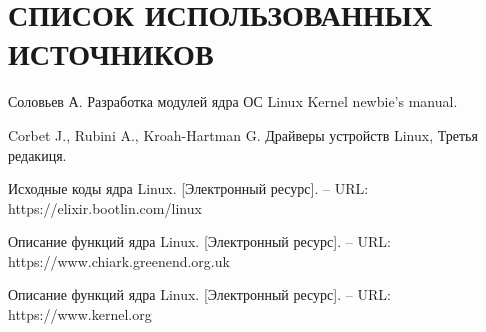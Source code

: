 \section*{СПИСОК ИСПОЛЬЗОВАННЫХ ИСТОЧНИКОВ}

\begingroup
\renewcommand{\section}[2]{}
\begin{thebibliography}{}
	Соловьев А. Разработка модулей ядра ОС Linux Kernel newbie's manual.

	Corbet J., Rubini A., Kroah-Hartman G. Драйверы устройств Linux, Третья редакиця.
	
	Исходные коды ядра Linux. [Электронный ресурс]. – URL: https://elixir.bootlin.com/linux
	
	Описание функций ядра Linux. [Электронный ресурс]. – URL: https://www.chiark.greenend.org.uk
	
	Описание функций ядра Linux.  [Электронный ресурс]. – URL: https://www.kernel.org
\end{thebibliography}


\endgroup

\pagebreak